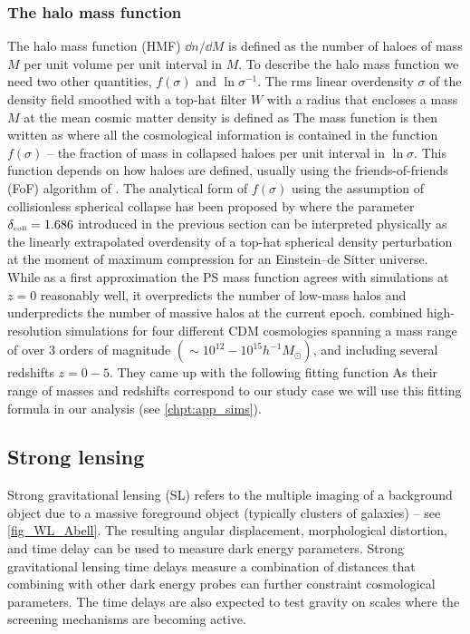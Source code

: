 \subsubsection{The halo mass function}
The halo mass function (HMF) $\dd n/\dd M$ is defined as the number of haloes of mass $M$ per unit volume per unit interval in $M$. To describe the halo mass function we need two other quantities, $f(\sigma)$ and $\ln\sigma^{-1}$. The rms linear overdensity $\sigma$ of the density field smoothed with a top-hat filter $W$ with a radius that encloses a mass $M$ at the mean cosmic matter density is defined as
The mass function is then written as
where all the cosmological information is contained in the function \(f(\sigma)\) --  the fraction of mass in collapsed haloes per unit interval in $\ln\sigma$. This function depends on how haloes are defined, usually using the friends-of-friends (FoF) algorithm of \textcite{1985ApJ...292..371D}. The analytical form of $f(\sigma)$ using the assumption of collisionless spherical collapse has been proposed by \textcite{1974ApJ...187..425P}
where the parameter \(\delta_\text{\tiny coll}=1.686\) introduced in the previous section can be interpreted physically as the linearly extrapolated overdensity of a top-hat spherical density perturbation at the moment of maximum compression for an Einstein--de Sitter universe. While as a first approximation the PS mass function agrees with simulations at $z=0$ reasonably well, it overpredicts the number of low-mass halos and underpredicts the number of massive halos at the current epoch. \textcite{2001MNRAS.321..372J} combined high-resolution simulations for four different CDM cosmologies spanning a mass range of over 3 orders of magnitude $(\sim10^{12}-10^{15}h^{-1}M_\odot)$, and including several redshifts $z=0-5$. They came up with the following fitting function
As their range of masses and redshifts correspond to our study case we will use this fitting formula in our analysis (see \autoref{chpt:app_sims}).
\subsection{Strong lensing}
Strong gravitational lensing (SL) refers to the multiple imaging of a background object due to a massive foreground object (typically clusters of galaxies) -- see \autoref{fig_WL_Abell}. The resulting angular displacement, morphological distortion, and time delay can be used to measure dark energy parameters. Strong gravitational lensing time delays measure a combination of distances that combining with other dark energy probes can further constraint cosmological parameters. The time delays are also expected to test gravity on scales where the screening mechanisms are becoming active.

